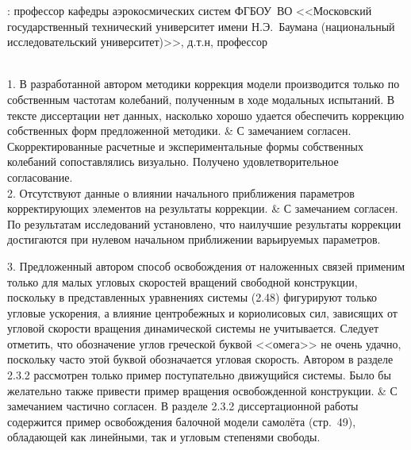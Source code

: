 \begin{frame}
	\beginSkip
	: профессор кафедры аэрокосмических систем ФГБОУ~ВО <<Московский государственный технический университет имени Н.Э.~Баумана (национальный исследовательский университет)>>, д.т.н, профессор \\
	 \\
		\begin{comtblr}{17em}
		1. В разработанной автором методики коррекция модели производится только по собственным частотам колебаний, полученным в ходе модальных испытаний. В тексте диссертации нет данных, насколько хорошо удается обеспечить коррекцию собственных форм предложенной методики.
		&
		С замечанием согласен. Скорректированные расчетные и экспериментальные формы собственных колебаний сопоставлялись визуально. Получено удовлетворительное согласование. \\
		2. Отсутствуют данные о влиянии начального приближения параметров корректирующих элементов на результаты коррекции.
		&
		С замечанием согласен. По результатам исследований установлено, что наилучшие результаты коррекции достигаются при нулевом начальном приближении варьируемых параметров. 
	\end{comtblr}
\end{frame}

\begin{frame}
	\vspace{0.3em}
	\begin{comtblr}{}
		3. Предложенный автором способ освобождения от наложенных связей применим только для малых угловых скоростей вращений свободной конструкции, поскольку в представленных уравнениях системы (2.48) фигурируют только угловые ускорения, а влияние центробежных и кориолисовых сил, зависящих от угловой скорости вращения динамической системы не учитывается. Следует отметить, что обозначение углов греческой буквой <<омега>> не очень удачно, поскольку часто этой буквой обозначается угловая скорость. Автором в разделе 2.3.2 рассмотрен только пример поступательно движущийся системы. Было бы желательно также привести пример вращения освобожденной конструкции.
		&
		С замечанием частично согласен. В разделе 2.3.2 диссертационной работы содержится пример освобождения балочной модели самолёта (стр.~49), обладающей как линейными, так и угловым степенями свободы. \\
	\end{comtblr}
\end{frame}

